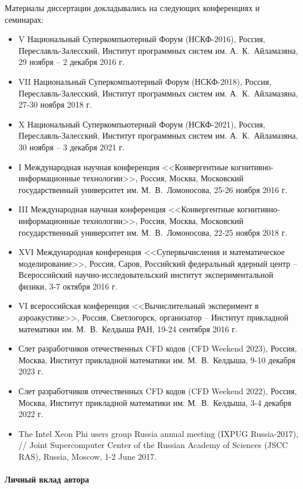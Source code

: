 \documentclass[a4paper,14pt]{extarticle}                     %
\theoremstyle{plain}                                         %
\begin{document}
Материалы диссертации докладывались на следующих конференциях и семинарах:
\begin{itemize}[noitemsep,topsep=0pt,parsep=0pt,partopsep=0pt]
\item V Национальный Суперкомпьютерный Форум (НСКФ-2016), Россия, Переславль-Залесский, Институт программных систем им. А.~К.~Айламазяна, 29 ноября -- 2 декабря 2016 г.
\item VII Национальный Суперкомпьютерный Форум (НСКФ-2018), Россия, Переславль-Залесский, Институт программных систем им. А.~К.~Айламазяна, 27-30 ноября 2018 г.
\item X Национальный Суперкомпьютерный Форум (НСКФ-2021), Россия, Переславль-Залесский, Институт программных систем им. А.~К.~Айламазяна, 30 ноября -- 3 декабря 2021 г.
\item I Международная научная конференция <<Конвергентные когнитивно-информационные технологии>>, Россия, Москва, Московский государственный университет им. М.~В.~Ломоносова, 25-26 ноября 2016 г.
\item III Международная научная конференция <<Конвергентные когнитивно-информационные технологии>>, Россия, Москва, Московский государственный университет им. М.~В.~Ломоносова, 22-25 ноября 2018 г.
\item XVI Международная конференция <<Супервычисления и математическое моделирование>>, Россия, Саров, Российский федеральный ядерный центр -- Всероссийский научно-исследовательский институт экспериментальной физики, 3-7 октября 2016 г.
\item VI всероссийская конференция <<Вычислительный эксперимент в аэроакустике>>, Россия, Светлогорск, организатор -- Институт прикладной математики им. М.~В.~Келдыша РАН, 19-24 сентября 2016 г.
\item Слет разработчиков отечественных CFD кодов (CFD Weekend 2023), Россия, Москва, Институт прикладной математики им. М.~В.~Келдыша, 9-10 декабря 2023 г.
\item Слет разработчиков отечественных CFD кодов (CFD Weekend 2022), Россия, Москва, Институт прикладной математики им. М.~В.~Келдыша, 3-4 декабря 2022 г.
\item The Intel Xeon Phi users group Russia annual meeting (IXPUG Russia-2017), // Joint Supercomputer Center of the Russian Academy of Sciences (JSCC RAS), Russia, Moscow, 1-2 June 2017.
\end{itemize}

\paragraph{Личный вклад автора} 
\end{document}

